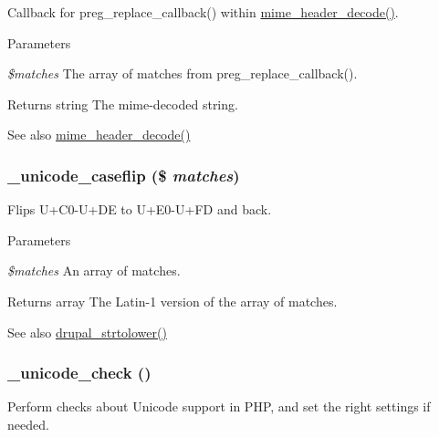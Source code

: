 Callback for preg\_\-replace\_\-callback() within \hyperlink{unicode_8inc_ab925f3117ef3c0d5736c4c38d0346aa3}{mime\_\-header\_\-decode()}.


\begin{DoxyParams}{Parameters}
\item[{\em \$matches}]The array of matches from preg\_\-replace\_\-callback().\end{DoxyParams}
\begin{DoxyReturn}{Returns}
string The mime-\/decoded string.
\end{DoxyReturn}
\begin{DoxySeeAlso}{See also}
\hyperlink{unicode_8inc_ab925f3117ef3c0d5736c4c38d0346aa3}{mime\_\-header\_\-decode()} 
\end{DoxySeeAlso}
\hypertarget{unicode_8inc_a3c12a2422e0b0719d038fe9b5092413c}{
\subsubsection[{\_\-unicode\_\-caseflip}]{\setlength{\rightskip}{0pt plus 5cm}\_\-unicode\_\-caseflip (\$ {\em matches})}}
\label{unicode_8inc_a3c12a2422e0b0719d038fe9b5092413c}
Flips U+C0-\/U+DE to U+E0-\/U+FD and back.


\begin{DoxyParams}{Parameters}
\item[{\em \$matches}]An array of matches.\end{DoxyParams}
\begin{DoxyReturn}{Returns}
array The Latin-\/1 version of the array of matches.
\end{DoxyReturn}
\begin{DoxySeeAlso}{See also}
\hyperlink{group__php__wrappers_gad97b9d0b7d26db7c62671e9ddce98f8f}{drupal\_\-strtolower()} 
\end{DoxySeeAlso}
\hypertarget{unicode_8inc_a8dd710941673e87ac38417d396622cba}{
\subsubsection[{\_\-unicode\_\-check}]{\setlength{\rightskip}{0pt plus 5cm}\_\-unicode\_\-check ()}}
\label{unicode_8inc_a8dd710941673e87ac38417d396622cba}
Perform checks about Unicode support in PHP, and set the right settings if needed.

